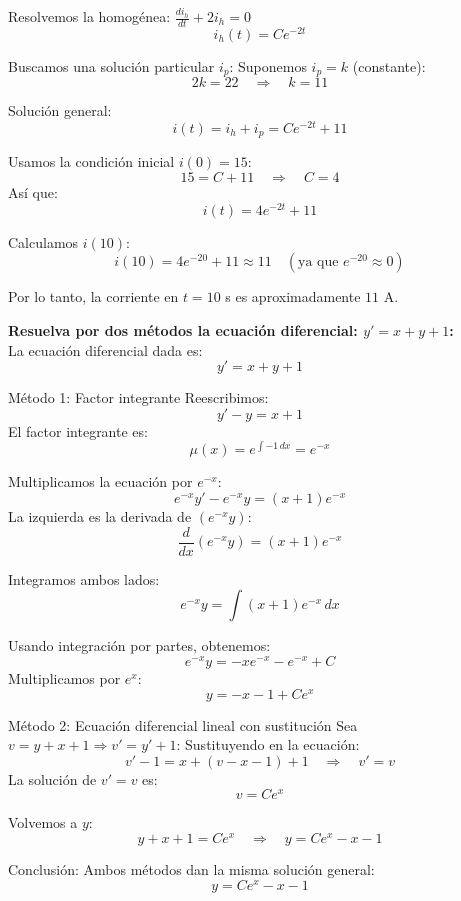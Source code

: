 \documentclass[answers]{exam}
\begin{document}
\begin{questions}
		Resolvemos la homogénea: $\frac{di_h}{dt} + 2i_h = 0$  
		\[
		i_h(t) = Ce^{-2t}
		\]
		
		Buscamos una solución particular $i_p$:  
		Suponemos $i_p = k$ (constante):  
		\[
		2k = 22 \quad \Rightarrow \quad k = 11
		\]
		
		Solución general:  
		\[
		i(t) = i_h + i_p = Ce^{-2t} + 11
		\]
		
		Usamos la condición inicial $i(0)=15$:  
		\[
		15 = C + 11 \quad \Rightarrow \quad C = 4
		\]
		Así que:  
		\[
		i(t) = 4e^{-2t} + 11
		\]
		
		Calculamos $i(10)$:  
		\[
		i(10) = 4e^{-20} + 11 \approx 11 \quad (\text{ya que } e^{-20} \approx 0)
		\]
		
		Por lo tanto, la corriente en $t=10$ s es aproximadamente $11$ A.  		
	
	\vspace{0.5cm}
	
	
	\question \large\textbf{Resuelva por dos métodos la ecuación diferencial: $y' = x + y + 1$:}\\
	
		La ecuación diferencial dada es:  
		\[
		y' = x + y + 1
		\]
		
		Método 1: Factor integrante  
		Reescribimos:  
		\[
		y' - y = x + 1
		\]
		El factor integrante es:  
		\[
		\mu(x) = e^{\int -1 \, dx} = e^{-x}
		\]
		
		Multiplicamos la ecuación por $e^{-x}$:  
		\[
		e^{-x}y' - e^{-x}y = (x+1)e^{-x}
		\]
		La izquierda es la derivada de $(e^{-x}y)$:  
		\[
		\frac{d}{dx}(e^{-x}y) = (x+1)e^{-x}
		\]
		
		Integramos ambos lados:  
		\[
		e^{-x}y = \int (x+1)e^{-x} \, dx
		\]
		
		Usando integración por partes, obtenemos:  
		\[
		e^{-x}y = -xe^{-x} - e^{-x} + C
		\]
		Multiplicamos por $e^x$:  
		\[
		y = -x - 1 + Ce^x
		\]
		
		Método 2: Ecuación diferencial lineal con sustitución  
		Sea $v = y + x + 1 \Rightarrow v' = y' + 1$:  
		Sustituyendo en la ecuación:  
		\[
		v' - 1 = x + (v - x - 1) + 1 \quad \Rightarrow \quad v' = v
		\]
		La solución de $v' = v$ es:  
		\[
		v = Ce^x
		\]
		
		Volvemos a $y$:  
		\[
		y + x + 1 = Ce^x \quad \Rightarrow \quad y = Ce^x - x - 1
		\]
		
		Conclusión:  
		Ambos métodos dan la misma solución general:  
		\[
		\boxed{y = Ce^x - x - 1}
		\]
		
	\vspace{0.5cm}

\end{questions}
\end{document}
